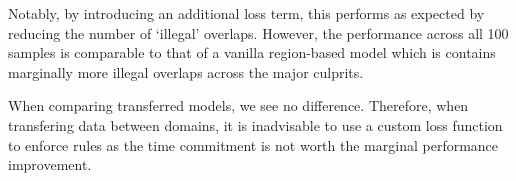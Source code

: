\documentclass[11pt,twoside]{report}
\begin{document}
Notably, by introducing an additional loss term, this performs as expected by reducing the number of `illegal' overlaps. However, the performance across all 100 samples is comparable to that of a vanilla region-based model which is contains marginally more illegal overlaps across the major culprits.

When comparing transferred models, we see no difference. Therefore, when transfering data between domains, it is inadvisable to use a custom loss function to enforce rules as the time commitment is not worth the marginal performance improvement.









\end{document}
